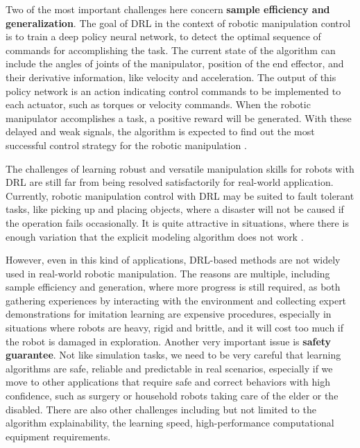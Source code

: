 Two of the most important challenges here concern \textbf{sample efficiency and generalization}.
The goal of DRL in the context of robotic manipulation
control is to train a deep policy neural network, to detect the optimal
sequence of commands for accomplishing the task. The current state of the algorithm can include
the angles of joints of the manipulator, position of the end effector, and their derivative information,
like velocity and acceleration. The output of this policy network is an action indicating control
commands to be implemented to each actuator, such as torques or velocity commands. When the robotic manipulator
accomplishes a task, a positive reward will be generated. With these delayed and weak
signals, the algorithm is expected to find out the most successful control strategy for the
robotic manipulation \cite{liu2021deep}.

The challenges of learning robust and versatile manipulation skills
for robots with DRL are still far from being resolved satisfactorily for real-world application.
Currently, robotic manipulation control with DRL may be suited to fault tolerant
tasks, like picking up and placing objects, where a disaster will not be caused if the
operation fails occasionally. It is quite attractive in situations, where there is enough
variation that the explicit modeling algorithm does not work \cite{liu2021deep}.

However, even in this kind of applications, DRL-based methods are not widely
used in real-world robotic manipulation. The reasons are multiple, including sample efficiency and generation,
where more progress is still required, as both gathering experiences by interacting with
the environment and collecting expert demonstrations for imitation learning are expensive
procedures, especially in situations where robots are heavy, rigid and brittle, and it will
cost too much if the robot is damaged in exploration. Another very important issue is
\textbf{safety guarantee}. Not like simulation tasks, we need to be very careful that learning
algorithms are safe, reliable and predictable in real scenarios, especially if we move to
other applications that require safe and correct behaviors with high confidence, such as
surgery or household robots taking care of the elder or the disabled. There are also other
challenges including but not limited to the algorithm explainability, the learning speed,
high-performance computational equipment requirements. \cite{liu2021deep}

